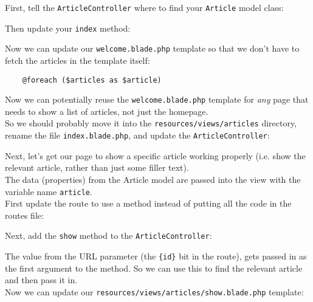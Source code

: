 First, tell the \texttt{ArticleController} where to find your \texttt{Article} model class:


Then update your \texttt{index} method:


Now we can update our \texttt{welcome.blade.php} template so that we don't have to fetch the articles in the template itself:

\begin{verbatim}
    @foreach ($articles as $article)
\end{verbatim}

Now we can potentially reuse the \texttt{welcome.blade.php} template for \textit{any} page that needs to show a list of articles, not just the homepage.
\\

So we should probably move it into the \texttt{resources/views/articles} directory, rename the file \texttt{index.blade.php}, and update the \texttt{ArticleController}:


Next, let's get our page to show a specific article working properly (i.e. show the relevant article, rather than just some filler text).
\\

The data (properties) from the Article model are passed into the view with the variable name \texttt{article}.
\\

First update the route to use a method instead of putting all the code in the routes file:


Next, add the \texttt{show} method to the \texttt{ArticleController}:


The value from the URL parameter (the \texttt{\{id\}} bit in the route), gets passed in as the first argument to the method. So we can use this to find the relevant article and then pass it in.
\\

Now we can update our \texttt{resources/views/articles/show.blade.php} template:

